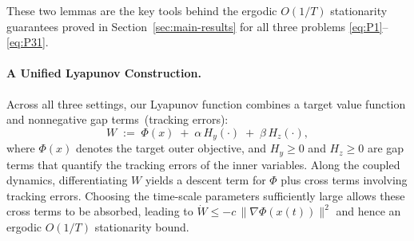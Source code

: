 \documentclass{article}
\newcommand{\1}{\mathbf{1}}
\begin{document}
These two lemmas are the key tools behind the ergodic $O(1/T)$ stationarity guarantees proved in Section~\ref{sec:main-results} for all three problems \ref{eq:P1}--\ref{eq:P31}.








\paragraph{A Unified Lyapunov Construction.}
Across all three settings, our Lyapunov function combines a target value function and nonnegative gap terms~(tracking errors):
\begin{equation}\label{eq:W-template}
W \;:=\; \Phi(x)\;+\;\alpha\,H_{y}(\cdot)\;+\;\beta\,H_{z}(\cdot),
\end{equation}
where $\Phi(x)$ denotes the target outer objective, and $H_{y}\ge 0$ and $H_{z}\ge 0$ are gap terms that quantify the tracking errors of the inner variables.
Along the coupled dynamics, differentiating $W$ yields a descent term for $\Phi$ plus cross terms involving tracking errors.
Choosing the time-scale parameters sufficiently large allows these cross terms to be absorbed, leading to $\dot W\le -c\,\|\nabla \Phi(x(t))\|^2$ and hence an ergodic $O(1/T)$ stationarity bound. 
\end{document}
